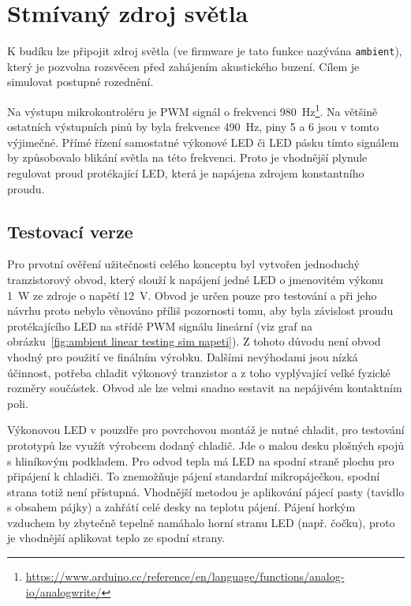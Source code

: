 \section{Stmívaný zdroj světla}
K budíku lze připojit zdroj světla (ve firmware je tato funkce nazývána
\texttt{ambient}), který je pozvolna rozsvěcen před zahájením akustického
buzení. Cílem je simulovat postupné rozednění.

Na výstupu  mikrokontroléru je PWM signál o frekvenci
\SI{980}{\hertz}\footnote{\url{https://www.arduino.cc/reference/en/language/functions/analog-io/analogwrite/}}.
Na většině ostatních výstupních pinů by byla frekvence \SI{490}{\hertz}, piny 5
a 6 jsou v tomto výjimečné. %
Přímé řízení samostatné výkonové LED či LED pásku tímto signálem by způsobovalo
blikání světla na této frekvenci. Proto je vhodnější plynule regulovat proud
protékající LED, která je napájena zdrojem konstantního proudu.


\subsection{Testovací verze}
Pro prvotní ověření užitečnosti celého konceptu byl vytvořen jednoduchý
tranzistorový obvod, který slouží k napájení jedné LED o jmenovitém výkonu
\SI{1}{\watt} ze zdroje o napětí \SI{12}{\volt}. Obvod je určen pouze pro
testování a při jeho návrhu proto nebylo věnováno příliš pozornosti tomu, aby
byla závislost proudu protékajícího LED na střídě PWM signálu lineární (viz
graf na obrázku~\vref{fig:ambient linear testing sim napeti}).
Z tohoto důvodu není obvod vhodný pro použití ve finálním výrobku. Dalšími
nevýhodami jsou nízká účinnost, potřeba chladit výkonový tranzistor a z toho
vyplývající velké fyzické rozměry součástek. Obvod ale lze velmi snadno
sestavit na nepájivém kontaktním poli.

Výkonovou LED v pouzdře pro povrchovou montáž je nutné chladit, pro testování
prototypů lze využít výrobcem dodaný chladič. Jde o malou desku plošných spojů
s hliníkovým podkladem. Pro odvod tepla má LED na spodní straně plochu pro
připájení k chladiči. To znemožňuje pájení standardní mikropáječkou, spodní
strana totiž není přístupná. Vhodnější metodou je aplikování pájecí pasty
(tavidlo s obsahem pájky) a zahřátí celé desky na teplotu pájení. Pájení horkým
vzduchem by zbytečně tepelně namáhalo horní stranu LED (např. čočku), proto je
vhodnější aplikovat teplo ze spodní strany.

